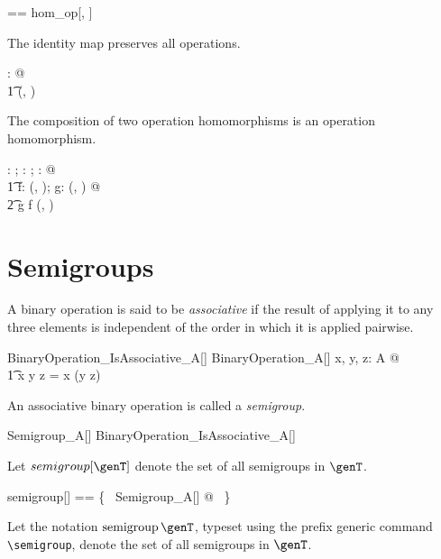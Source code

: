 \documentclass{amsart}
\begin{document}
\begin{zed}
	\homBinOp[\genT, \genU] == hom\_op[\genT, \genU]
\end{zed}

\begin{remark}
The identity map preserves all operations.
\begin{zed}
	\forall \strucA: \binop \setX @ \\
	\t1	\id \setX \in \homBinOp(\strucA, \strucA)
\end{zed}
\end{remark}

\begin{remark}
The composition of two operation homomorphisms is an operation homomorphism.
\begin{zed}
	\forall \strucA: \binop \setX; \strucB: \binop \setY; \strucC: \binop \setZ @ \\
	\t1	\forall f: \homBinOp(\strucA, \strucB); g: \homBinOp(\strucB, \strucC) @ \\
	\t2		g \circ f \in \homBinOp(\strucA, \strucC)
\end{zed}
\end{remark}

\section{Semigroups}

A binary operation is said to be \textit{associative} if the result of applying it to any three elements
is independent of the order in which it is applied pairwise.

\begin{schema}{BinaryOperation\_IsAssociative\_A}[\genT]
	BinaryOperation\_A[\genT]
\where
	\forall x, y, z: A @ \\
	\t1	x \mulA y \mulA z = x \mulA (y \mulA z)
\end{schema}

An associative binary operation is called a \textit{semigroup}.
\begin{zed}
	Semigroup\_A[\genT]  BinaryOperation\_IsAssociative\_A[\genT]
\end{zed}

Let $semigroup[\genT]$ denote the set of all semigroups in $\genT$.

\begin{zed}
	semigroup[\genT] == \{~ Semigroup\_A[\genT] @ \strucA  ~\}
\end{zed}

Let the notation $\semigroup \genT$, typeset using the prefix generic command \verb|\semigroup|,
denote the set of all semigroups in $\genT$.
\end{document}
